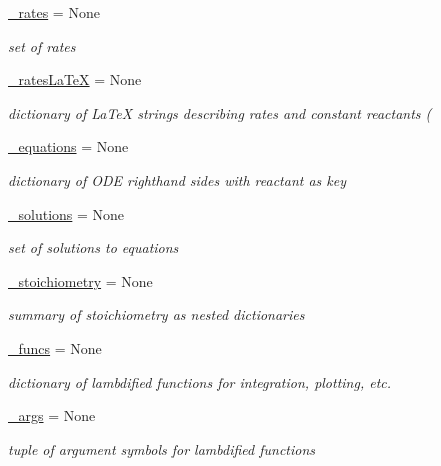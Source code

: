 \begin{DoxyCompactItemize}
\hyperlink{class_mu_mo_t_1_1_mu_mo_t_1_1_mu_mo_tmodel_a45fe1a3c95be7c7db64a0199619569a9}{\+\_\+rates} = None
\begin{DoxyCompactList}\small\item\em set of rates \end{DoxyCompactList}\item 
\hyperlink{class_mu_mo_t_1_1_mu_mo_t_1_1_mu_mo_tmodel_a795ce014c05817c0ac931270e961020f}{\+\_\+rates\+La\+TeX} = None
\begin{DoxyCompactList}\small\item\em dictionary of La\+TeX strings describing rates and constant reactants ( \end{DoxyCompactList}\item 
\hyperlink{class_mu_mo_t_1_1_mu_mo_t_1_1_mu_mo_tmodel_ab9682b098aac7aac3179a3773749fd71}{\+\_\+equations} = None
\begin{DoxyCompactList}\small\item\em dictionary of O\+DE righthand sides with reactant as key \end{DoxyCompactList}\item 
\hyperlink{class_mu_mo_t_1_1_mu_mo_t_1_1_mu_mo_tmodel_a31c9407d55747598fa4c9efdd6f9293d}{\+\_\+solutions} = None
\begin{DoxyCompactList}\small\item\em set of solutions to equations \end{DoxyCompactList}\item 
\hyperlink{class_mu_mo_t_1_1_mu_mo_t_1_1_mu_mo_tmodel_a1169ac9500b9a6214b2566582bb64308}{\+\_\+stoichiometry} = None
\begin{DoxyCompactList}\small\item\em summary of stoichiometry as nested dictionaries \end{DoxyCompactList}\item 
\hyperlink{class_mu_mo_t_1_1_mu_mo_t_1_1_mu_mo_tmodel_a8ef9f9e4473f46043da1484716b18268}{\+\_\+funcs} = None
\begin{DoxyCompactList}\small\item\em dictionary of lambdified functions for integration, plotting, etc. \end{DoxyCompactList}\item 
\hyperlink{class_mu_mo_t_1_1_mu_mo_t_1_1_mu_mo_tmodel_a04c0353d4e8a6c3f2e0a1fb36ed9a832}{\+\_\+args} = None
\begin{DoxyCompactList}\small\item\em tuple of argument symbols for lambdified functions \end{DoxyCompactList}\item 

\end{DoxyCompactItemize}
